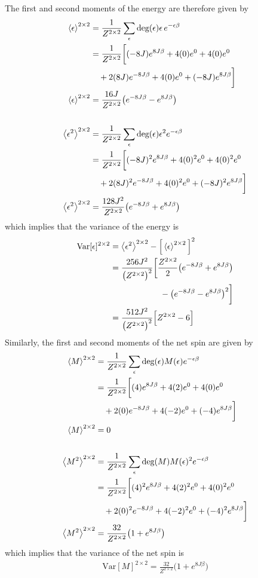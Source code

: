 \documentclass[nofootinbib,reprint,english]{revtex4-1}
\begin{document}
The first and second moments of the energy are therefore given by
\begin{align}
\expval{\epsilon}^{2\times2}&=\frac{1}{Z^{2\times2}}\sum_\epsilon\text{deg}(\epsilon)\epsilon\,e^{-\epsilon\beta}\nonumber\\
&=\frac{1}{Z^{2\times2}}\bigg[(-8J)e^{8J\beta}+4(0)e^0+4(0)e^0\nonumber\\
&\quad+2(8J)e^{-8J\beta}+4(0)e^0+(-8J)e^{8J\beta}\bigg]\nonumber\\
\expval{\epsilon}^{2\times2}&=\frac{16J}{Z^{2\times2}}\big(e^{-8J\beta}-e^{8J\beta}\big)\\[6mm]
\expval{\epsilon^2}^{2\times2}&=\frac{1}{Z^{2\times2}}\sum_\epsilon\text{deg}(\epsilon)\epsilon^2e^{-\epsilon\beta}\nonumber\\
&=\frac{1}{Z^{2\times2}}\bigg[(-8J)^2e^{8J\beta}+4(0)^2e^0+4(0)^2e^0\nonumber\\
&\quad+2(8J)^2e^{-8J\beta}+4(0)^2e^0+(-8J)^2e^{8J\beta}\bigg]\nonumber\\
\expval{\epsilon^2}^{2\times2}&=\frac{128J^2}{Z^{2\times2}}\big(e^{-8J\beta}+e^{8J\beta}\big)
\end{align}
which implies that the variance of the energy is
\begin{align}
\text{Var}[\epsilon]^{2\times2}&=\expval{\epsilon^2}^{2\times2}-\Big[\expval{\epsilon}^{2\times2}\Big]^2\nonumber\\
&=\frac{256J^2}{\big(Z^{2\times2}\big)^2}\bigg[\frac{Z^{2\times2}}{2}\big(e^{-8J\beta}+e^{8J\beta}\big)\nonumber\\
&\qquad\qquad\qquad-\big(e^{-8J\beta}-e^{8J\beta}\big)^2\bigg]\nonumber\\
&=\frac{512J^2}{\big(Z^{2\times2}\big)^2}\Big[Z^{2\times2}-6\Big]\label{eq:2by2_epsilon_variance}
\end{align}
\newpage
Similarly, the first and second moments of the net spin are given by
\begin{align}
\expval{M}^{2\times2}&=\frac{1}{Z^{2\times2}}\sum_\epsilon\text{deg}(\epsilon)M(\epsilon) e^{-\epsilon\beta}\nonumber\\
&=\frac{1}{Z^{2\times2}}\bigg[(4)e^{8J\beta}+4(2)e^0+4(0)e^0\nonumber\\
&\quad+2(0)e^{-8J\beta}+4(-2)e^0+(-4)e^{8J\beta}\bigg]\nonumber\\
\expval{M}^{2\times2}&=0\\[6mm]
\expval{M^2}^{2\times2}&=\frac{1}{Z^{2\times2}}\sum_\epsilon\text{deg}(M)M(\epsilon)^2e^{-\epsilon\beta}\nonumber\\
&=\frac{1}{Z^{2\times2}}\bigg[(4)^2e^{8J\beta}+4(2)^2e^0+4(0)^2e^0\nonumber\\
&\quad+2(0)^2e^{-8J\beta}+4(-2)^2e^0+(-4)^2e^{8J\beta}\bigg]\nonumber\\
\expval{M^2}^{2\times2}&=\frac{32}{Z^{2\times2}}\big(1+e^{8J\beta}\big)
\end{align}
which implies that the variance of the net spin is
\begin{align}
\text{Var}[M]^{2\times2}=\frac{32}{Z^{2\times2}}\big(1+e^{8J\beta}\big)\label{eq:2by2_netspin_variance}
\end{align}
\end{document}
